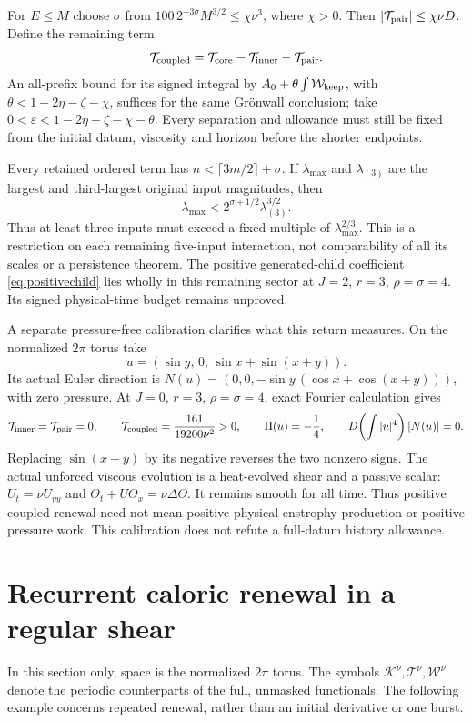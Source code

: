 \documentclass[11pt]{article}
\begin{document}
For $E\leq M$ choose $\sigma$ from
$100\,2^{-3\sigma}M^{3/2}\leq\chi\nu^3$, where $\chi>0$.
Then $|\mathcal T_{\rm pair}|\leq\chi\nu D$.
Define the remaining term
\[
 \mathcal T_{\rm coupled}
  =\mathcal T_{\rm core}-\mathcal T_{\rm inner}-\mathcal T_{\rm pair}.
\]
An all-prefix bound for its signed integral by
$A_0+\theta\int\mathcal W_{\rm keep}$, with
$\theta<1-2\eta-\zeta-\chi$, suffices for the same
Gr\"onwall conclusion; take
$0<\varepsilon<1-2\eta-\zeta-\chi-\theta$.
Every separation and allowance must still be fixed from the initial
datum, viscosity and horizon before the shorter endpoints.

Every retained ordered term has
$n<\lceil3m/2\rceil+\sigma$. If $\lambda_{\max}$ and
$\lambda_{(3)}$ are the largest and third-largest original input
magnitudes, then
\[
 \lambda_{\max}<2^{\sigma+1/2}\lambda_{(3)}^{3/2}.
\]
Thus at least three inputs must exceed a fixed multiple of
$\lambda_{\max}^{2/3}$. This is a restriction on each remaining
five-input interaction, not comparability of all its scales or a
persistence theorem. The positive generated-child coefficient
\eqref{eq:positivechild} lies wholly in this remaining sector at
$J=2$, $r=3$, $\rho=\sigma=4$. Its signed physical-time budget
remains unproved.

A separate pressure-free calibration clarifies what this return measures.
On the normalized $2\pi$ torus take
\[
 u=(\sin y,\,0,\,\sin x+\sin(x+y)).
\]
Its actual Euler direction is
$N(u)=(0,0,-\sin y\,(\cos x+\cos(x+y)))$, with zero pressure.
At $J=0$, $r=3$, $\rho=\sigma=4$, exact Fourier calculation gives
\[
 \mathcal T_{\rm inner}=\mathcal T_{\rm pair}=0,\qquad
 \mathcal T_{\rm coupled}=\frac{161}{19200\nu^2}>0,\qquad
 \Pi(u)=-\frac14,\qquad
 D\!\left(\int|u|^4\right)[N(u)]=0.
\]
Replacing $\sin(x+y)$ by its negative reverses the two nonzero signs.
The actual unforced viscous evolution is a heat-evolved shear and a
passive scalar:
$U_t=\nu U_{yy}$ and
$\Theta_t+U\Theta_x=\nu\Delta\Theta$.
It remains smooth for all time. Thus positive coupled renewal need not
mean positive physical enstrophy production or positive pressure work.
This calibration does not refute a full-datum history allowance.

\section{Recurrent caloric renewal in a regular shear}

In this section only, space is the normalized $2\pi$ torus. The symbols
$\mathcal K^\nu,\mathcal T^\nu,\mathcal W^\nu$ denote the periodic
counterparts of the full, unmasked functionals. The following example
concerns repeated renewal, rather than an initial derivative or one burst.
\end{document}
